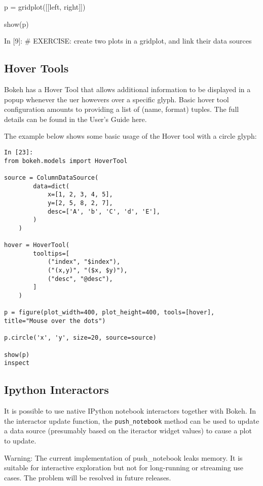 \documentclass[a4paper,12pt]{article}
\begin{document}
p = gridplot([[left, right]])

show(p)
 
In [9]:
# EXERCISE: create two plots in a gridplot, and link their data sources
\subsection{Hover Tools}
Bokeh has a Hover Tool that allows additional information to be displayed in a popup whenever the uer howevers over a specific glyph. Basic hover tool configuration amounts to providing a list of (name, format) tuples. The full details can be found in the User's Guide here.

The example below shows some basic usage of the Hover tool with a circle glyph:

\begin{framed}
\begin{verbatim}
In [23]:
from bokeh.models import HoverTool

source = ColumnDataSource(
        data=dict(
            x=[1, 2, 3, 4, 5],
            y=[2, 5, 8, 2, 7],
            desc=['A', 'b', 'C', 'd', 'E'],
        )
    )

hover = HoverTool(
        tooltips=[
            ("index", "$index"),
            ("(x,y)", "($x, $y)"),
            ("desc", "@desc"),
        ]
    )

p = figure(plot_width=400, plot_height=400, tools=[hover], title="Mouse over the dots")

p.circle('x', 'y', size=20, source=source)

show(p)
inspect 	
\end{verbatim}
\end{framed}
\subsection{Ipython Interactors}
It is possible to use native IPython notebook interactors together with Bokeh. In the interactor update function, the \texttt{push\_notebook} method can be used to update a data source (presumably based on the iteractor widget values) to cause a plot to update.

Warning: The current implementation of push_notebook leaks memory. It is suitable for interactive exploration but not for long-running or streaming use cases. The problem will be resolved in future releases.
\end{document}
